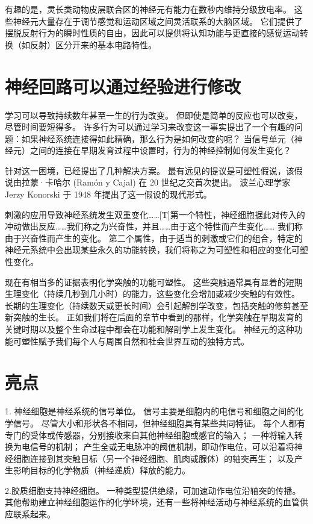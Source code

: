 有趣的是，灵长类动物皮层联合区的神经元有能力在数秒内维持分级放电率。 这些神经元大量存在于调节感觉和运动区域之间灵活联系的大脑区域。 它们提供了摆脱反射行为的瞬时性质的自由，因此可以提供将认知功能与更直接的感觉运动转换（如反射）区分开来的基本电路特性。


\section{神经回路可以通过经验进行修改}
学习可以导致持续数年甚至一生的行为改变。 但即使是简单的反应也可以改变，尽管时间要短得多。 许多行为可以通过学习来改变这一事实提出了一个有趣的问题：如果神经系统连接得如此精确，那么行为是如何改变的呢？ 当信号单元（神经元）之间的连接在早期发育过程中设置时，行为的神经控制如何发生变化？

针对这一困境，已经提出了几种解决方案。 最有远见的提议是可塑性假说，该假说由拉蒙·卡哈尔 (Ramón y Cajal) 在 20 世纪之交首次提出。 波兰心理学家 Jerzy Konorski 于 1948 年提出了这一假设的现代形式。

刺激的应用导致神经系统发生双重变化……[T]第一个特性，神经细胞据此对传入的冲动做出反应……我们称之为兴奋性，并且……由于这个特性而产生变化…… 我们称由于兴奋性而产生的变化。 第二个属性，由于适当的刺激或它们的组合，特定的神经元系统中会出现某些永久的功能转换，我们将称之为可塑性和相应的变化可塑性变化。

现在有相当多的证据表明化学突触的功能可塑性。 这些突触通常具有显着的短期生理变化（持续几秒到几小时）的能力，这些变化会增加或减少突触的有效性。 长期的生理变化（持续数天或更长时间）会引起解剖学改变，包括突触的修剪甚至新突触的生长。 正如我们将在后面的章节中看到的那样，化学突触在早期发育的关键时期以及整个生命过程中都会在功能和解剖学上发生变化。 神经元的这种功能可塑性赋予我们每个人与周围自然和社会世界互动的独特方式。



\section{亮点}
1. 神经细胞是神经系统的信号单位。 信号主要是细胞内的电信号和细胞之间的化学信号。 尽管大小和形状各不相同，但神经细胞具有某些共同特征。 每个人都有专门的受体或传感器，分别接收来自其他神经细胞或感官的输入； 一种将输入转换为电信号的机制； 产生全或无电脉冲的阈值机制，即动作电位，可以沿着将神经细胞连接到其突触目标（另一个神经细胞、肌肉或腺体）的轴突再生； 以及产生影响目标的化学物质（神经递质）释放的能力。

2.胶质细胞支持神经细胞。 一种类型提供绝缘，可加速动作电位沿轴突的传播。 其他帮助建立神经细胞运作的化学环境，还有一些将神经活动与神经系统的血管供应联系起来。

